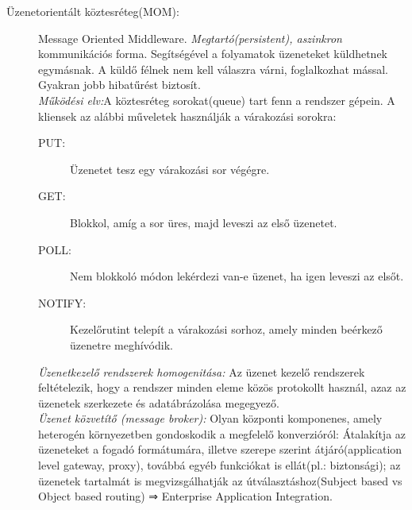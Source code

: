 \documentclass[12pt]{article}
\begin{document}
\begin{description}
    \item[Üzenetorientált köztesréteg(MOM):] Message Oriented Middleware. \textit{Megtartó(persistent), aszinkron} kommunikációs forma. Segítségével a folyamatok üzeneteket küldhetnek egymásnak. A küldő félnek nem kell válaszra várni, foglalkozhat mással. Gyakran jobb hibatűrést biztosít. \\\textit{Működési elv:}A köztesréteg sorokat(queue) tart fenn a rendszer gépein. A kliensek az alábbi műveletek használják a várakozási sorokra:
        \begin{description}
            \item[PUT:] Üzenetet tesz egy várakozási sor végégre.
            \item[GET:] Blokkol, amíg a sor üres, majd leveszi az első üzenetet.
            \item[POLL:] Nem blokkoló módon lekérdezi van-e üzenet, ha igen leveszi az elsőt.
            \item[NOTIFY:] Kezelőrutint telepít a várakozási sorhoz, amely minden beérkező üzenetre meghívódik.
        \end{description}
        \textit{Üzenetkezelő rendszerek homogenitása:} Az üzenet kezelő rendszerek feltételezik, hogy a rendszer minden eleme közös protokollt használ, azaz az üzenetek szerkezete és adatábrázolása megegyező.
        \\\textit{Üzenet közvetítő (message broker):} Olyan központi komponenes, amely heterogén környezetben gondoskodik a megfelelő konverzióról: Átalakítja az üzeneteket a fogadó formátumára, illetve szerepe szerint átjáró(application level gateway, proxy), továbbá egyéb funkciókat is ellát(pl.: biztonsági); az üzenetek tartalmát is megvizsgálhatják az útválasztáshoz(Subject based vs Object based routing) ⇒ Enterprise Application Integration.

\end{description}
\end{document}
